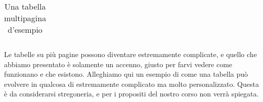 \begin{center}
\begin{longtable}{llll}
\caption{Una tabella multipagina d'esempio}
\label{tabella:esempio_tabella_lunga}
\end{longtable}
\end{center}

Le tabelle su più pagine possono diventare estremamente complicate, e quello 
che abbiamo presentato è solamente un accenno, giusto per farvi vedere come 
funzionano e che esistono.
Alleghiamo qui un esempio di come una tabella può evolvere in qualcosa di 
estremamente complicato ma molto personalizzato. Questa è da considerarsi 
stregoneria, e per i propositi del nostro corso non verrà spiegata.


